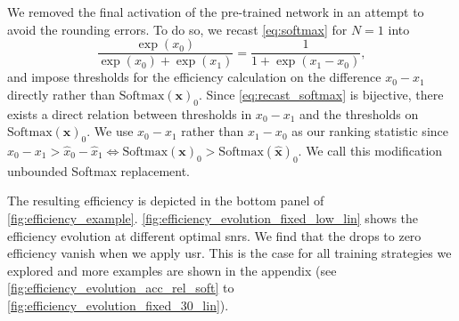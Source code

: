 We removed the final activation of the pre-trained network in an attempt to avoid the rounding errors. To do so, we recast \eqref{eq:softmax} for $N=1$ into
\begin{equation}\label{eq:recast_softmax}
    \frac{\exp\left(x_0\right)}{\exp\left(x_0\right)+\exp\left(x_1\right)}=\frac{1}{1+\exp\left(x_1-x_0\right)},
\end{equation}
and impose thresholds for the efficiency calculation on the difference $x_0-x_1$ directly rather than ${\text{Softmax}\left(\bm{x}\right)}_0$. Since \eqref{eq:recast_softmax} is bijective, there exists a direct relation between thresholds in $x_0-x_1$ and the thresholds on $\text{Softmax}\left(\bm{x}\right)_0$. We use $x_0-x_1$ rather than $x_1-x_0$ as our ranking statistic since $x_0-x_1>\hat{x}_0-\hat{x}_1\Leftrightarrow {\text{Softmax}\left(\bm{x}\right)}_0>{\text{Softmax}\left(\bm{\hat{x}}\right)}_0$. We call this modification unbounded Softmax replacement.

The resulting efficiency is depicted in the bottom panel of \autoref{fig:efficiency_example}. \autoref{fig:efficiency_evolution_fixed_low_lin} shows the efficiency evolution at different optimal \acrshort{snr}s. We find that the drops to zero efficiency vanish when we apply \acrshort{usr}. This is the case for all training strategies we explored and more examples are shown in the appendix (see \autoref{fig:efficiency_evolution_acc_rel_soft} to \autoref{fig:efficiency_evolution_fixed_30_lin}).

